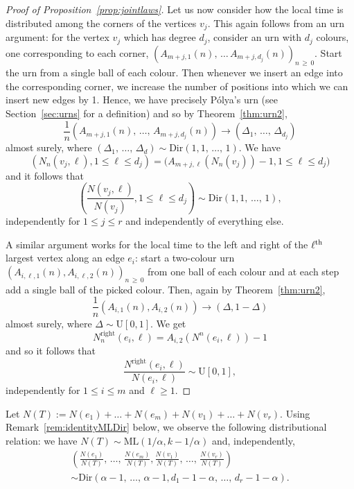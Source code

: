 \documentclass[AHL,Unicode,longabstracts,published]{cedram}
\newcommand{\ML}{\mathrm{ML}}
\newcommand{\Rightll}{\mathrm{right}}
\newcommand{\rmU}{\mathrm{U}}
\newcommand{\Dir}{\mathrm{Dir}}
\begin{document}
\begin{proof}[Proof of Proposition~\ref{prop:jointlaws}]
Let us now consider how the local time is distributed among the corners of the vertices $v_j$. This again follows from an urn argument: for the vertex $v_j$ which has degree $d_j$, consider an urn with $d_j$ colours, one corresponding to each corner, $(A_{m+j,1}(n),\,\ldots\,A_{m+j, d_j}(n))_{n\,\ge\,0}$. Start the urn from a single ball of each colour. Then whenever we insert an edge into the corresponding corner, we increase the number of positions into which we can insert new edges by 1. Hence, we have precisely P\'olya's urn (see Section~\ref{sec:urns} for a definition) and so by Theorem~\ref{thm:urn2},
\[
\frac{1}{n} \left(A_{m+j,1}(n),\,\ldots,\, A_{m+j,d_j}(n)\right) \to \left(\Delta_1,\,\ldots,\, \Delta_{d_j}\right)
\]
almost surely, where $(\Delta_1,\,\ldots,\,\Delta_d) \sim \Dir(1,1,\,\ldots,\,1)$. We have
\[
\left(N_n\left(v_j,\ell\right), 1 \le \ell \le d_j\right) = \big(A_{m+j,\ell}\left(N_n(v_j)\right) - 1, 1 \le \ell \le d_j\big)
\]
and it follows that
\[
\left(\frac{N(v_j,\ell)}{N(v_j)}, 1 \le \ell \le d_j\right) \sim \Dir(1,1,\,\ldots,\,1),
\]
independently for $1 \le j \le r$ and independently of everything else.

A similar argument works for the local time to the left and right of the $\ell^{\rm th}$ largest vertex along an edge $e_i$: start a two-colour urn $(A_{i,\ell,1}(n), A_{i,\ell,2}(n))_{n\,\ge\,0}$ from one ball of each colour and at each step add a single ball of the picked colour. Then, again by Theorem~\ref{thm:urn2},
\[
\frac{1}{n} \left(A_{i,1}(n), A_{i,2}(n)\right) \to (\Delta,1-\Delta)
\]
almost surely, where $\Delta \sim \rmU[0,1]$. We get
\[
N^{\Rightll}_n\left(e_i,\ell\right) = A_{i, 2}\left(N^n\left(e_i, \ell\right)\right) - 1
\]
and so it follows that
\[
\frac{N^{\Rightll}(e_i,\ell)}{N(e_i,\ell)} \sim \rmU[0,1],
\]
independently for $1 \le i \le m$ and $\ell \ge 1$.
\end{proof}

\begin{rema}\label{rem:distribution temps local aretes et noeuds}
Let $N(T):=N(e_1)+\dots+N(e_m)+N(v_1)+\dots+N(v_r)$. Using Remark~\ref{rem:identityMLDir} below, we observe the following distributional relation: we have $N(T)\sim \ML(1/\alpha, k-1/\alpha)$ and, independently,
\begin{multline*}
\left(\frac{N(e_1)}{N(T)},\,\dots,\,\frac{N(e_m)}{N(T)},\frac{N(v_1)}{N(T)},\,\dots,\,\frac{N(v_r)}{N(T)}\right)\\
\sim \Dir\left(\alpha-1,\,\dots,\,\alpha-1,d_1-1-\alpha,\,\dots,\,d_r-1-\alpha\right).
\end{multline*}
\end{rema}
\end{document}
